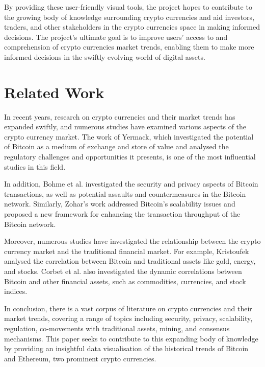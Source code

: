 \documentclass[10pt,twocolumn,a4paper]{article}
\begin{document}
By providing these user-friendly visual tools, the project hopes to contribute to the growing body of knowledge surrounding crypto currencies and aid investors, traders, and other stakeholders in the crypto currencies space in making informed decisions\cite{sun}. The project's ultimate goal is to improve users' access to and comprehension of crypto currencies market trends, enabling them to make more informed decisions in the swiftly evolving world of digital assets.

\section{Related Work}
In recent years, research on crypto currencies and their market trends has expanded swiftly, and numerous studies have examined various aspects of the crypto currency market. The work of Yermack\cite{Yermack2013}, which investigated the potential of Bitcoin as a medium of exchange and store of value and analysed the regulatory challenges and opportunities it presents, is one of the most influential studies in this field. 

In addition, Bohme et al. \cite{Bohme2015} investigated the security and privacy aspects of Bitcoin transactions, as well as potential assaults and countermeasures in the Bitcoin network. Similarly, Zohar's \cite{Zohar2015BitcoinUT} work addressed Bitcoin's scalability issues and proposed a new framework for enhancing the transaction throughput of the Bitcoin network.

Moreover, numerous studies have investigated the relationship between the crypto currency market and the traditional financial market. For example, Kristoufek \cite{Kristoufek2014} analysed the correlation between Bitcoin and traditional assets like gold, energy, and stocks. Corbet et al. \cite{Corbet2018} also investigated the dynamic correlations between Bitcoin and other financial assets, such as commodities, currencies, and stock indices.

In conclusion, there is a vast corpus of literature on crypto currencies and their market trends, covering a range of topics including security, privacy, scalability, regulation, co-movements with traditional assets, mining, and consensus mechanisms. This paper seeks to contribute to this expanding body of knowledge by providing an insightful data visualisation of the historical trends of Bitcoin and Ethereum, two prominent crypto currencies.
\end{document}
